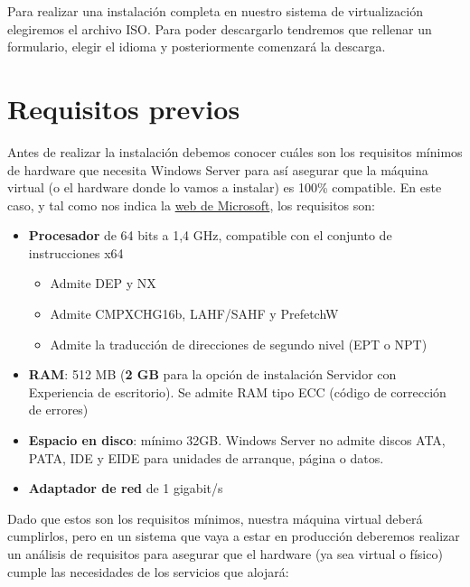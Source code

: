 Para realizar una instalación completa en nuestro sistema de virtualización elegiremos el archivo ISO. Para poder descargarlo tendremos que rellenar un formulario, elegir el idioma y posteriormente comenzará la descarga.

\section{Requisitos previos}
Antes de realizar la instalación debemos conocer cuáles son los requisitos mínimos de hardware que necesita Windows Server para así asegurar que la máquina virtual (o el hardware donde lo vamos a instalar) es 100\% compatible. En este caso, y tal como nos indica la \href{https://docs.microsoft.com/es-es/windows-server/get-started/hardware-requirements}{web de Microsoft}, los requisitos son:

\begin{itemize}
    \item \textbf{Procesador} de 64 bits a 1,4 GHz, compatible con el conjunto de instrucciones x64
    \begin{itemize}
        \item Admite DEP y NX
        \item Admite CMPXCHG16b, LAHF/SAHF y PrefetchW
        \item Admite la traducción de direcciones de segundo nivel (EPT o NPT)
    \end{itemize}
    \item \textbf{RAM}: 512 MB (\textbf{2 GB} para la opción de instalación Servidor con Experiencia de escritorio). Se admite RAM tipo ECC (código de corrección de errores)
    \item \textbf{Espacio en disco}:  mínimo 32GB. Windows Server no admite discos ATA, PATA, IDE y EIDE para unidades de arranque, página o datos.
    \item \textbf{Adaptador de red} de 1 gigabit/s
\end{itemize}

Dado que estos son los requisitos mínimos, nuestra máquina virtual deberá cumplirlos, pero en un sistema que vaya a estar en producción deberemos realizar un análisis de requisitos para asegurar que el hardware (ya sea virtual o físico) cumple las necesidades de los servicios que alojará:

